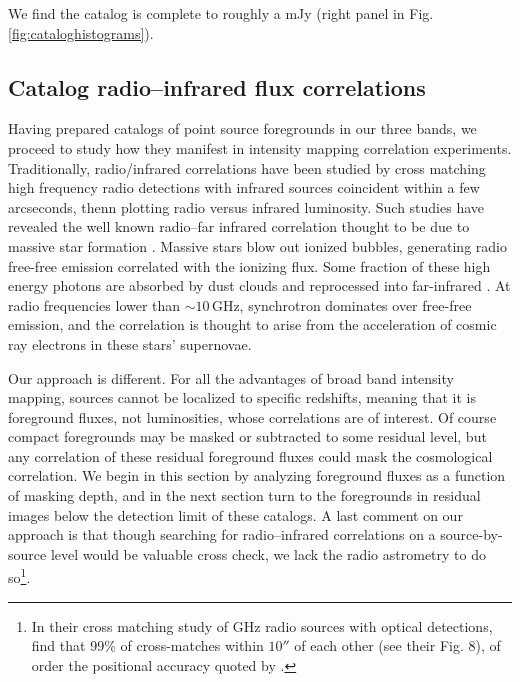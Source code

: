 \documentclass{emulateapj}
\begin{document}
We find the catalog is complete to roughly a mJy (right panel in Fig. \ref{fig:cataloghistograms}). 



\subsection{Catalog radio--infrared flux correlations}
\label{sec:catcorrelations}

Having prepared catalogs of point source foregrounds in our three bands, we proceed to study how they manifest in intensity mapping correlation experiments. Traditionally, radio/infrared correlations have been studied by cross matching high frequency radio detections with infrared sources coincident within a few arcseconds, thenn plotting radio versus infrared luminosity. Such studies have revealed the well known radio--far infrared correlation thought to be due to massive star formation \citep[e.g.][]{helou85,dejong85,yun01,xu94}. Massive stars blow out ionized bubbles, generating radio free-free emission correlated with the ionizing flux. Some fraction of these high energy photons are absorbed by dust clouds and reprocessed into far-infrared \citep{xu94}. At radio frequencies lower than $\sim10$\,GHz, synchrotron dominates over free-free emission, and the correlation is thought to arise from the acceleration of cosmic ray electrons in these stars' supernovae. 

Our approach is different. For all the advantages of broad band intensity mapping, sources cannot be localized to specific redshifts, meaning that it is foreground fluxes, not luminosities, whose correlations are of interest. Of course compact foregrounds may be masked or subtracted to some residual level, but any correlation of these residual foreground fluxes could mask the cosmological correlation. We begin in this section by analyzing foreground fluxes as a function of masking depth, and in the next section turn to the foregrounds in residual images below the detection limit of these catalogs. A last comment on our approach is that though searching for radio--infrared correlations on a source-by-source level would be valuable cross check, we lack the radio astrometry to do so\footnote{In their cross matching study of GHz radio sources with optical detections, \citep{mcmahon02} find that 99\% of cross-matches within $10''$ of each other (see their Fig. 8), of order the positional accuracy quoted by \citet{PattiCatalog1}.}. 
\end{document}
